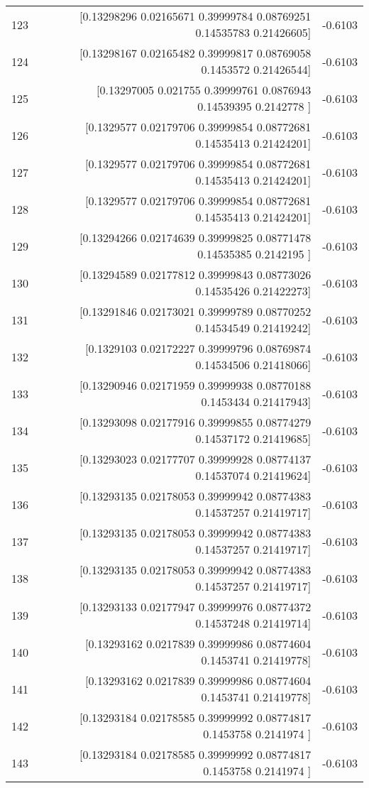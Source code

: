 \begin{longtable}{lrr}
123 & [0.13298296 0.02165671 0.39999784 0.08769251 0.14535783 0.21426605] & -0.6103 \\
124 & [0.13298167 0.02165482 0.39999817 0.08769058 0.1453572  0.21426544] & -0.6103 \\
125 & [0.13297005 0.021755   0.39999761 0.0876943  0.14539395 0.2142778 ] & -0.6103 \\
126 & [0.1329577  0.02179706 0.39999854 0.08772681 0.14535413 0.21424201] & -0.6103 \\
127 & [0.1329577  0.02179706 0.39999854 0.08772681 0.14535413 0.21424201] & -0.6103 \\
128 & [0.1329577  0.02179706 0.39999854 0.08772681 0.14535413 0.21424201] & -0.6103 \\
129 & [0.13294266 0.02174639 0.39999825 0.08771478 0.14535385 0.2142195 ] & -0.6103 \\
130 & [0.13294589 0.02177812 0.39999843 0.08773026 0.14535426 0.21422273] & -0.6103 \\
131 & [0.13291846 0.02173021 0.39999789 0.08770252 0.14534549 0.21419242] & -0.6103 \\
132 & [0.1329103  0.02172227 0.39999796 0.08769874 0.14534506 0.21418066] & -0.6103 \\
133 & [0.13290946 0.02171959 0.39999938 0.08770188 0.1453434  0.21417943] & -0.6103 \\
134 & [0.13293098 0.02177916 0.39999855 0.08774279 0.14537172 0.21419685] & -0.6103 \\
135 & [0.13293023 0.02177707 0.39999928 0.08774137 0.14537074 0.21419624] & -0.6103 \\
136 & [0.13293135 0.02178053 0.39999942 0.08774383 0.14537257 0.21419717] & -0.6103 \\
137 & [0.13293135 0.02178053 0.39999942 0.08774383 0.14537257 0.21419717] & -0.6103 \\
138 & [0.13293135 0.02178053 0.39999942 0.08774383 0.14537257 0.21419717] & -0.6103 \\
139 & [0.13293133 0.02177947 0.39999976 0.08774372 0.14537248 0.21419714] & -0.6103 \\
140 & [0.13293162 0.0217839  0.39999986 0.08774604 0.1453741  0.21419778] & -0.6103 \\
141 & [0.13293162 0.0217839  0.39999986 0.08774604 0.1453741  0.21419778] & -0.6103 \\
142 & [0.13293184 0.02178585 0.39999992 0.08774817 0.1453758  0.2141974 ] & -0.6103 \\
143 & [0.13293184 0.02178585 0.39999992 0.08774817 0.1453758  0.2141974 ] & -0.6103 \\

\end{longtable}
